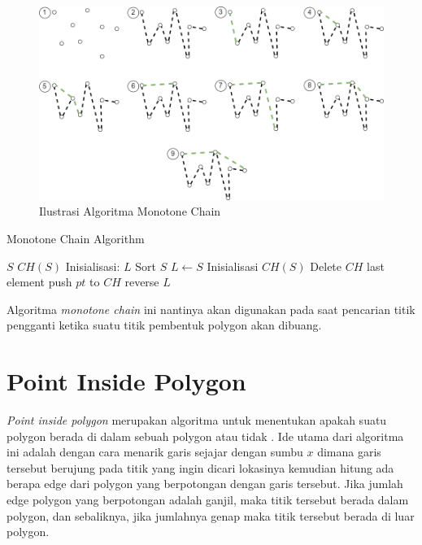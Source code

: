 \begin{figure}[!h]
	\Centering
	\includegraphics [width=\columnwidth]{bab2/img/ilustrasi-algoritma-monotone-chain}
	\caption {Ilustrasi Algoritma Monotone Chain}
	\label {fig:ilustrasi-algoritma-monotone-chain}
\end{figure}

\begin{algorithm}
	\caption{Monotone Chain Algorithm}
	\label{psdo:Monotone-Chain-Algorithm}
	\begin{algorithmic}[1]
		\Require $S$
		\Ensure $CH(S)$
        \State Inisialisasi: $L$
        \State Sort $S$
        \State $L \leftarrow S$
        \State Inisialisasi $CH(S)$
                    \State Delete $CH$ last element
                \EndWhile
                \State push $pt$ to $CH$
            \EndFor
            \State reverse $L$
        \EndFor
	\end{algorithmic}
\end{algorithm}
\par Algoritma \textit{monotone chain} ini nantinya akan digunakan pada saat pencarian titik pengganti ketika suatu titik pembentuk polygon akan dibuang.

\section{ Point Inside Polygon}
\label{sec:point-inside-polygon}
\textit{Point inside polygon} merupakan algoritma untuk menentukan apakah suatu polygon berada di dalam sebuah polygon atau tidak \cite{point_inside_polygon}. Ide utama dari algoritma ini adalah dengan cara menarik garis sejajar dengan sumbu $x$ dimana garis tersebut berujung pada titik yang ingin dicari lokasinya kemudian hitung ada berapa edge dari polygon yang berpotongan dengan garis tersebut. Jika jumlah edge polygon yang berpotongan adalah ganjil, maka titik tersebut berada dalam polygon, dan sebaliknya, jika jumlahnya genap maka titik tersebut berada di luar polygon.

